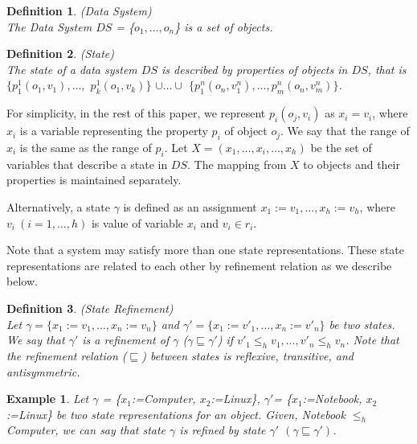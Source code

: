 \documentclass[12pt,journal,letterpaper,onecolumn]{IEEEtran}
\newtheorem{definition}{Definition}[section]
\newtheorem{example}{Example}[section]
\begin{document}
\begin{definition}(Data System)\\
The Data System $DS$ = \{$o_1,\ldots,o_n$\} is a set of objects.
\label{def:ds}
\end{definition}

\begin{definition}(State)\\
The state of a data system $DS$ is described by properties of
objects in $DS$, that is
$\{p_1^1(o_1,v_1),\ldots,$ $p_k^1(o_1,v_k)\}$ $\cup \ldots \cup$
$\{p_1^n(o_n,v^n_1),\ldots,p_m^n(o_n,v^n_m)\}$.
 \label{def:state}
\end{definition}

For simplicity, in
the rest of this paper, we represent $p_i(o_j,v_i)$ as $x_i=v_i$,
where $x_i$ is a variable representing the property $p_i$ of object
$o_j$. We say that the range of $x_i$ is the same as the range of
$p_i$. Let $X = (x_1,\ldots,x_i,\ldots,x_{h})$ be the set of
variables that describe a state in $DS$. The mapping from  $X$ to
objects and their properties is maintained separately.

 Alternatively, a state $\gamma$ is defined as an assignment
$x_1:=v_1, \ldots, x_h:=v_h$, where $v_i~(i=1,\ldots,h)$ is value of
variable $x_i$ and $v_i \in r_i$.


Note that a system may satisfy more than one state representations.
These state representations are related to each other by refinement
relation as we describe below.
\begin{definition} (State Refinement)\\
\noindent Let $\gamma = \{x_1:=v_1, \ldots, x_n:=v_n\}$ and $\gamma' =
\{x_1:=v'_1, \ldots, x_n:=v'_n\}$ be two states. We say that $\gamma'$ is
a refinement of $\gamma$ ($\gamma \sqsubseteq \gamma'$) if $v'_1 \leq_h v_1, \ldots,
v'_n \leq_h v_n$. Note that the refinement relation ($\sqsubseteq$)
between states is reflexive, transitive, and antisymmetric.
\end{definition}

\begin{example} Let  $\gamma$ = \{$x_1$:={\ttfamily Computer},
$x_2$:={\ttfamily Linux\}}, $\gamma'$= \{$x_1$:={\ttfamily Notebook}, $x_2$:={\ttfamily Linux\}} be two state representations for an object. Given,
{\ttfamily Notebook} $\leq_h$ {\ttfamily Computer}, we can say that
state $\gamma$ is refined by state $\gamma'$ $(\gamma \sqsubseteq \gamma')$. \label{eg:state}
\end{example}
\end{document}
